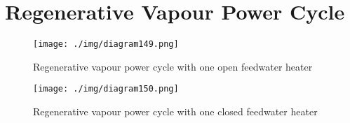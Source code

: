\section{Regenerative Vapour Power Cycle}
\begin{figure}[H]
  \centering
  \texttt{[image: ./img/diagram149.png]}
  \caption{Regenerative vapour power cycle with one open feedwater heater}
\end{figure}
\begin{figure}[H]
  \centering
  \texttt{[image: ./img/diagram150.png]}
  \caption{Regenerative vapour power cycle with one closed feedwater heater}
\end{figure}